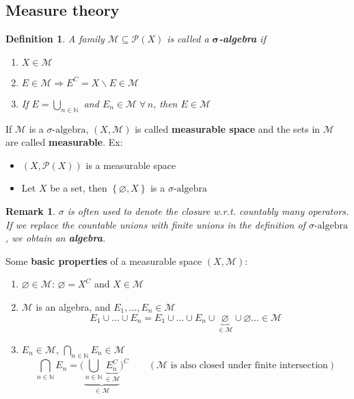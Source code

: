 \documentclass[a4paper,12pt]{article}
\theoremstyle{break}
\newtheorem{remark}[section]{Remark}
\newtheorem{definition}{Definition}[section]
\let\emptyset\varnothing
\newcommand{\sigalg}{\sigma\mbox{-algebra}}
\numberwithin{equation}{section}
\begin{document}
\subsection*{Measure theory}
\begin{definition}
    A family \(\mathcal{M} \subseteq \mathcal{P}(X)\) is called a \textbf{\(\mathbf{\sigma}\)-algebra} if 
    \begin{enumerate}
        \item \(X \in \mathcal{M}\)
        \item \(E \in \mathcal{M} \Longrightarrow E^C = X\backslash E \in \mathcal{M}\)
        \item If \(E = \bigcup_{n \in \mathbb{N}}\) and \(E_n \in \mathcal{M} \; \forall \, n\), then \(E \in \mathcal{M}\)
    \end{enumerate}
\end{definition}
If \(\mathcal{M}\) is a \(\sigalg\), \((X, \mathcal{M})\) is called \textbf{measurable space} and the sets in \(\mathcal{M}\) are called \textbf{measurable}.  
Ex: \begin{itemize}
    \item \((X, \mathcal{P}(X))\) is a measurable space
    \item Let \(X\) be a set, then \(\left\lbrace \emptyset, X \right\rbrace\) is a \(\sigalg\)
\end{itemize}
\begin{remark}
    \(\sigma\) is often used to denote the closure w.r.t. countably many operators. If we replace the countable unions with finite unions in the definition of \(\sigalg\), we obtain an \textbf{algebra}.
\end{remark}
Some \textbf{basic properties} of a measurable space \((X, \mathcal{M})\):
\begin{enumerate}
    \item \(\emptyset \in \mathcal{M}\): \(\emptyset = X^C\) and \(X \in \mathcal{M}\)
    \item \(\mathcal{M}\) is an algebra, and \(E_1, \ldots, E_n \in \mathcal{M}\)
    \[
        E_1 \cup \ldots \cup E_n = E_1 \cup \ldots \cup E_n \cup \underbrace{\emptyset}_{\in \mathcal{M}} \cup \emptyset \ldots \in \mathcal{M} 
    \]
    \item \(E_n \in \mathcal{M}\), \(\bigcap_{n \in \mathbb{N}} E_n \in \mathcal{M}\)
    \[
        \bigcap_{n \in \mathbb{N}} E_n = \biggl(\underbrace{\bigcup_{n \in \mathbb{N}} \underbrace{E_n^C}_{\in \mathcal{M}}}_{\in \mathcal{M}}\biggr)^C \qquad (\mathcal{M} \mbox{ is also closed under finite intersection})
    \]
    \end{enumerate}
\end{document}

